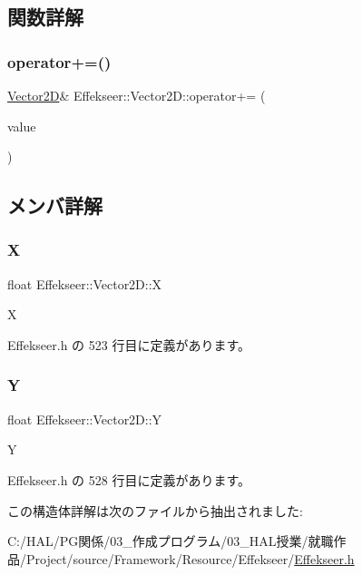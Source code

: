 \subsection{関数詳解}
\mbox{\label{struct_effekseer_1_1_vector2_d_aa86968d06d78c0a951e85f6a44b02f95}} 
\subsubsection{\texorpdfstring{operator+=()}{operator+=()}}
{\footnotesize\ttfamily \mbox{\hyperlink{struct_effekseer_1_1_vector2_d}{Vector2D}}\& Effekseer\+::\+Vector2\+D\+::operator+= (\begin{DoxyParamCaption}\item[{const \mbox{\hyperlink{struct_effekseer_1_1_vector2_d}{Vector2D}} \&}]{value }\end{DoxyParamCaption})}



\subsection{メンバ詳解}
\mbox{\label{struct_effekseer_1_1_vector2_d_ae84928d10dd54136f362361aad8fe4aa}} 
\subsubsection{\texorpdfstring{X}{X}}
{\footnotesize\ttfamily float Effekseer\+::\+Vector2\+D\+::X}



X 



 Effekseer.\+h の 523 行目に定義があります。

\mbox{\label{struct_effekseer_1_1_vector2_d_a648a6d6b86aaaeadc2302ae99d2d2768}} 
\subsubsection{\texorpdfstring{Y}{Y}}
{\footnotesize\ttfamily float Effekseer\+::\+Vector2\+D\+::Y}



Y 



 Effekseer.\+h の 528 行目に定義があります。



この構造体詳解は次のファイルから抽出されました\+:\begin{DoxyCompactItemize}
\item 
C\+:/\+H\+A\+L/\+P\+G関係/03\+\_\+作成プログラム/03\+\_\+\+H\+A\+L授業/就職作品/\+Project/source/\+Framework/\+Resource/\+Effekseer/\mbox{\hyperlink{_effekseer_8h}{Effekseer.\+h}}\end{DoxyCompactItemize}
